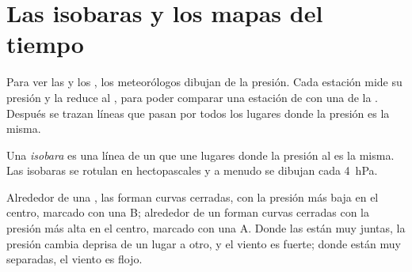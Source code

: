 \section{Las isobaras y los mapas del tiempo}

Para ver las  y los , los meteorólogos dibujan 
de la presión. Cada estación mide su presión y la reduce al ,
para poder comparar una estación de  con una de la . Después se
trazan líneas que pasan por todos los lugares donde la presión es la misma.

\begin{definition}[Isobara]\label{def:g8:fronts-and-weather-maps:isobar}
Una \emph{isobara} es una línea de un  que une lugares
donde la presión al  es la misma. Las isobaras se rotulan en
hectopascales y a menudo se dibujan cada \qty{4}{hPa}.
\end{definition}

Alrededor de una , las  forman curvas cerradas, con la
presión más baja en el centro, marcado con una B; alrededor de un
 forman curvas cerradas con la presión más alta en el centro,
marcado con una A. Donde las  están muy juntas, la presión cambia
deprisa de un lugar a otro, y el viento es fuerte; donde están muy
separadas, el viento es flojo.

